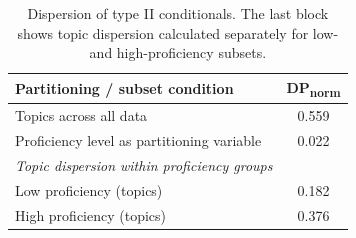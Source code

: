 \begin{table}[htbp]
\centering
\begin{tabular}{lc}
\hline
\textbf{Partitioning / subset condition} & \textbf{DP\textsubscript{norm}} \\
\hline
Topics across all data & 0.559 \\
Proficiency level as partitioning variable & 0.022 \\
\hline
\textit{Topic dispersion within proficiency groups} & \\
Low proficiency (topics) & 0.182 \\
High proficiency (topics) & 0.376 \\
\hline
\end{tabular}
\caption{Dispersion of type II conditionals. The last block shows topic dispersion calculated separately for low- and high-proficiency subsets.}
\label{tab:dispersion}
\end{table}